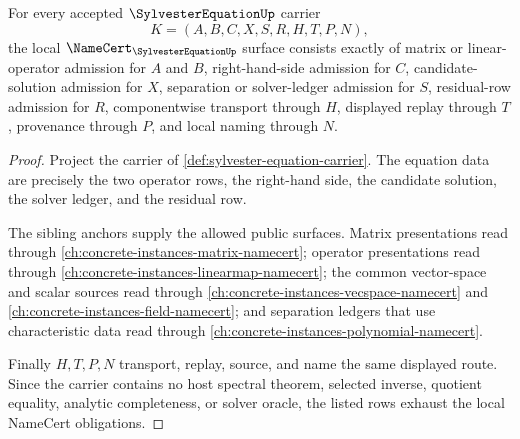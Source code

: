 \begin{theorem}
\label{thm:sylvester-equation-namecert-obligations}
For every accepted $\SylvesterEquationUp$ carrier
$$
K=(A,B,C,X,S,R,H,T,P,N),
$$
the local $\NameCert_{\SylvesterEquationUp}$ surface consists exactly of matrix or linear-operator admission for $A$ and $B$, right-hand-side admission for $C$, candidate-solution admission for $X$, separation or solver-ledger admission for $S$, residual-row admission for $R$, componentwise transport through $H$, displayed replay through $T$, provenance through $P$, and local naming through $N$.
\end{theorem}
\begin{proof}
Project the carrier of \autoref{def:sylvester-equation-carrier}. The equation data are precisely the two operator rows, the right-hand side, the candidate solution, the solver ledger, and the residual row.

The sibling anchors supply the allowed public surfaces. Matrix presentations read through \autoref{ch:concrete-instances-matrix-namecert}; operator presentations read through \autoref{ch:concrete-instances-linearmap-namecert}; the common vector-space and scalar sources read through \autoref{ch:concrete-instances-vecspace-namecert} and \autoref{ch:concrete-instances-field-namecert}; and separation ledgers that use characteristic data read through \autoref{ch:concrete-instances-polynomial-namecert}.

Finally $H,T,P,N$ transport, replay, source, and name the same displayed route. Since the carrier contains no host spectral theorem, selected inverse, quotient equality, analytic completeness, or solver oracle, the listed rows exhaust the local NameCert obligations.
\end{proof}

